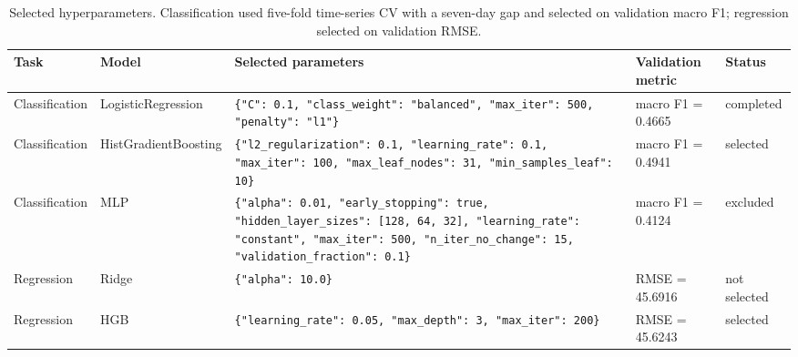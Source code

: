 \begin{table}[htbp]
\centering
\scriptsize
\caption{Selected hyperparameters. Classification used five-fold time-series CV with a seven-day gap and selected on validation macro F1; regression selected on validation RMSE.}
\label{tab:hyperparameters}
\begin{tabular}{llL{5.0cm}L{3.2cm}l}
\toprule
Task & Model & Selected parameters & Validation metric & Status \\
\midrule
Classification & LogisticRegression & \texttt{\{"C": 0.1, "class\_weight": "balanced", "max\_iter": 500, "penalty": "l1"\}} & macro F1 = 0.4665 & completed \\
Classification & HistGradientBoosting & \texttt{\{"l2\_regularization": 0.1, "learning\_rate": 0.1, "max\_iter": 100, "max\_leaf\_nodes": 31, "min\_samples\_leaf": 10\}} & macro F1 = 0.4941 & selected \\
Classification & MLP & \texttt{\{"alpha": 0.01, "early\_stopping": true, "hidden\_layer\_sizes": [128, 64, 32], "learning\_rate": "constant", "max\_iter": 500, "n\_iter\_no\_change": 15, "validation\_fraction": 0.1\}} & macro F1 = 0.4124 & excluded \\
Regression & Ridge & \texttt{\{"alpha": 10.0\}} & RMSE = 45.6916 & not selected \\
Regression & HGB & \texttt{\{"learning\_rate": 0.05, "max\_depth": 3, "max\_iter": 200\}} & RMSE = 45.6243 & selected \\
\bottomrule
\end{tabular}

\end{table}
